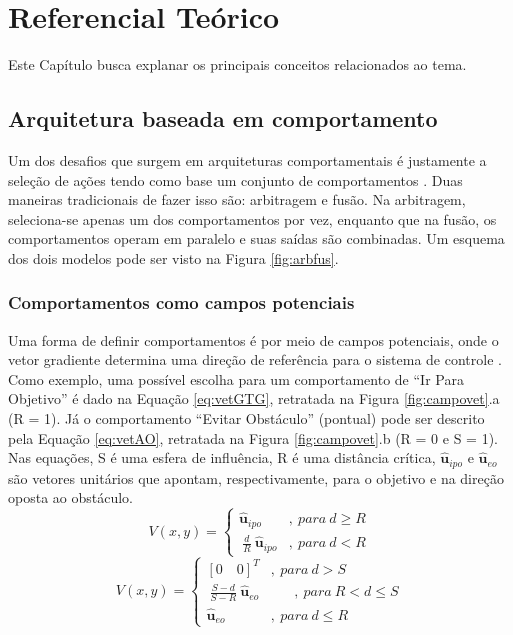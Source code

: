 \chapter{Referencial Teórico \label{CAP:TEORIA}}
\vspace{-2.5 cm}

Este Capítulo busca explanar os principais conceitos relacionados ao tema. 

\section{Arquitetura baseada em comportamento}

Um dos desafios que surgem em arquiteturas comportamentais é justamente a
seleção de ações tendo como base um conjunto de comportamentos
\cite{Livro_Mataric}. Duas maneiras tradicionais de fazer isso são: arbitragem e
fusão. Na arbitragem, seleciona-se apenas um dos comportamentos por vez,
enquanto que na fusão, os comportamentos operam em paralelo e suas saídas são
combinadas. Um esquema dos dois modelos pode ser visto na Figura \ref{fig:arbfus}. 



\subsection{Comportamentos como campos potenciais}

Uma forma de definir comportamentos é por meio de campos potenciais, onde o
vetor gradiente determina uma direção de referência para o sistema de controle
\cite{book:arkin, art:wallfollowing}. Como exemplo, uma possível escolha para um
comportamento de ``Ir Para Objetivo'' é dado na Equação \ref{eq:vetGTG},
retratada na Figura \ref{fig:campovet}.a (R = 1). Já o comportamento ``Evitar
Obstáculo'' (pontual) pode ser descrito pela Equação \ref{eq:vetAO}, retratada
na Figura \ref{fig:campovet}.b (R = 0 e S = 1). Nas equações, S é uma esfera de
influência, R é uma distância crítica, $\mathbf{\hat{u}}_{ipo}$ e
$\mathbf{\hat{u}}_{eo}$ são vetores unitários que apontam, respectivamente,
para o objetivo e na direção oposta ao obstáculo.
\begin{equation}
	\label{eq:vetGTG}
	V(x,y) = \left \{ \begin{matrix} \mathbf{\hat{u}}_{ipo} &, \ para\ d \geq R \\
	\ \frac{d}{R}\ \mathbf{\hat{u}}_{ipo} &,\ para\ d < R \end{matrix} \right.
\end{equation}
\begin{equation}
	\label{eq:vetAO}
	V(x,y) = \left \{ \begin{matrix} [0\quad0]^{T} &, \ para\ d > S \\
	\ \frac{S-d}{S-R}\ \mathbf{\hat{u}}_{eo} &\quad \ \ \ ,\ para\ R < d \leq S \\
	\mathbf{\hat{u}}_{eo} &,\ para\ d \leq R \end{matrix} \right.
\end{equation} 

